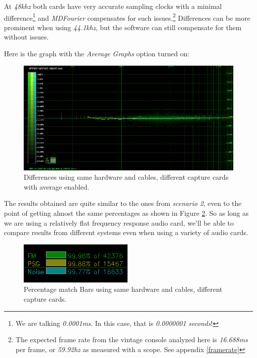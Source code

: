 \documentclass[10pt,a4paper]{report}
\newcommand{\ac}[1]{\textit{\acrshort{#1}}}
\newcommand{\hz}[1]{\textit{#1\acrshort{hz}}}
\newcommand{\khz}[1]{\textit{#1\acrshort{khz}}}
\begin{document}
At \khz{48} both cards have very accurate sampling clocks with a minimal difference\footnote{We are talking \textit{0.0001}\ac{ms}. In this case, that is \textit{0.0000001 seconds}!} and \textit{MDFourier} compensates for such issues.\footnote{The expected frame rate from the vintage console analyzed here is \textit{16.688}\ac{ms} per frame, or \hz{59.92} as measured with a scope. See appendix \ref{framerate}} Differences can be more prominent when using \khz{44.1}, but the software can still compensate for them without issues.

Here is the graph with the \textit{Average Graphs} option turned on:

\begin{figure}[H]
	\centering
	\includegraphics[width=1.0\linewidth]{images/interpretation/Plot5-2-avg.png}
	\caption[Different sound cards AVG]{Differences using same hardware and cables, different capture cards with average enabled.}
	\label{fig:plot5-2-avg}
\end{figure}

The results obtained are quite similar to the ones from \textit{scenario 2}, even to the point of getting almost the same percentages as shown in Figure \ref{fig:plot5-3-bars}. So as long as we are using a relatively flat frequency response audio card, we'll be able to compare results from different systems even when using a variety of audio cards.

\begin{figure}[H]
	\centering
	\includegraphics[width=0.4\linewidth]{images/interpretation/Plot5-3-bars.png}
	\caption[Different sound cards Bars]{Percentage match Bars using same hardware and cables, different capture cards.}
	\label{fig:plot5-3-bars}
\end{figure}
\end{document}

